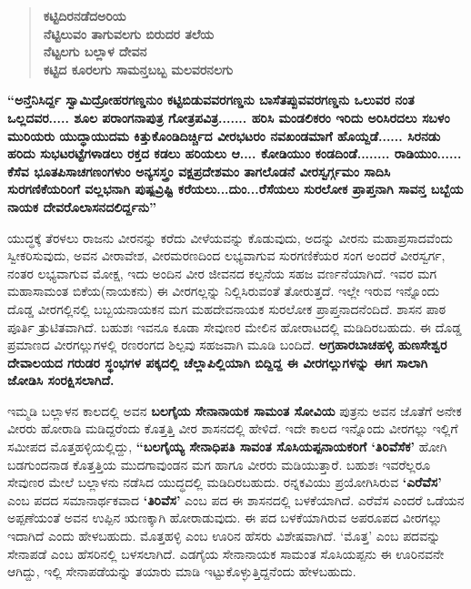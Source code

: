 \begin{verse}
\textbf{ಕಟ್ಟಿದಿರನಡೆದಅರಿಯ}\\\textbf{ನೆಟ್ಟಿಲುವಂ ತಾಗುವಲಗು ಬಿರುದರ ತಲೆಯ}\\\textbf{ನೆಟ್ಟಲಗು ಬಲ್ಲಾಳ ದೇವನ}\\\textbf{ಕಟ್ಟಿದ ಕೂರಲಗು ಸಾಮನ್ತಬಬ್ಬ ಮಲವರನಲಗು}
\end{verse}

\textbf{“ಅನ್ತೆನಿಸಿರ್ದ್ದ ಸ್ವಾಮಿದ್ರೋಹರಗಣ್ಡನುಂ ಕಟ್ಟಿಬಿಡುವವರಗಣ್ಡನು ಬಾಸೆತಪ್ಪುವವರಗಣ್ಡನು ಒಲುವರ ನಂತ\general{\break } ಒಲ್ಲದವರ..... ಶೂಲ ಪರಾಂಗನಾಪುತ್ರ ಗೋತ್ರಪವಿತ್ರ....... ಹರಿಸಿ ಮಂಡಲಿಕರಂ ಇರಿದು ಅರಿಸಿರದಲು ಸಬಳಂ ಮುರಿಯರು ಯುದ್ಧಾಯುದಮ ಕಿತ್ತುಕೊಂಡಿದಿರ್ಚ್ಚಿದ ವೀರಭಟರಂ ನವಖಂಡಮಾಗೆ ಹೊಯ್ದಡೆ...... ಸಿರನಡು ಹರಿದು ಸುಭಟರಟ್ಟೆಗಳಾಡಲು ರಕ್ತದ ಕಡಲು ಹರಿಯಲು ಆ.... ಕೋಡಿಯುಂ ಕಂಡದಿಂಡೆ........ ರಾಡಿಯುಂ...... ಕೆಸೆವ ಭೂತಪಿಸಾಚಗಣಂಗಳುಂ ಅನ್ಯಸಸ್ತ್ರಂ ವಕ್ಷಪ್ರದೇಶಮಂ ತಾಗಲೊಡನೆ ವೀರಸ್ವರ್ಗ್ಗಮಂ ಸಾದಿಸಿ ಸುರಗಣಿಕೆಯರಿಂಗೆ ವಲ್ಲಭನಾಗಿ ಪುಷ್ಪವ್ರಿಷ್ಟಿ ಕರೆಯಲು...ದುಂ...ರೆಸೆಯಲು ಸುರಲೋಕ ಪ್ರಾಪ್ತನಾಗಿ ಸಾವನ್ತ ಬಬ್ಬೆಯ ನಾಯಕ ದೇವರೊಲಾಸನದಲಿರ್ದ್ದನು”}

ಯುದ್ಧಕ್ಕೆ ತೆರಳಲು ರಾಜನು ವೀರನನ್ನು ಕರೆದು ವೀಳೆಯವನ್ನು ಕೊಡುವುದು, ಅದನ್ನು ವೀರನು ಮಹಾಪ್ರಸಾದ\-ವೆಂದು ಸ್ವೀಕರಿಸುವುದು, ಅವನ ವೀರಾವೇಶ, ವೀರಮರಣದಿಂದ ಲಭ್ಯವಾಗುವ ಸುರಗಣಿಕೆಯರ ಸಂಗ ಅಂದರೆ ವೀರಸ್ವರ್ಗ, ನಂತರ ಲಭ್ಯವಾಗುವ ಮೋಕ್ಷ, ಇದು ಅಂದಿನ ವೀರ ಜೀವನದ ಕಲ್ಪನೆಯ ಸಹಜ ವರ್ಣನೆಯಾಗಿದೆ. ಇವರ ಮಗ ಮಹಾಸಾಮಂತ ಬಿಕೆಯ(ನಾಯಕನು) ಈ ವೀರಗಲ್ಲನ್ನು ನಿಲ್ಲಿಸಿರುವಂತೆ ತೋರುತ್ತದೆ. ಇಲ್ಲೇ ಇರುವ ಇನ್ನೊಂದು ದೊಡ್ಡ ವೀರಗಲ್ಲಿನಲ್ಲಿ ಬಬ್ಬಯನಾಯಕನ ಮಗ ಮಹದೇವನಾಯಕ ಸುರಲೋಕ ಪ್ರಾಪ್ತನಾದನೆಂದಿದೆ. ಶಾಸನ ಪಾಠ ಪೂರ್ತಿ ತ್ರುಟಿತವಾಗಿದೆ. ಬಹುಶಃ ಇವನೂ ಕೂಡಾ ಸೇವುಣರ ಮೇಲಿನ ಹೋರಾಟದಲ್ಲಿ ಮಡಿದಿರಬಹುದು. ಈ ದೊಡ್ಡ ಪ್ರಮಾಣದ ವೀರಗಲ್ಲುಗಳಲ್ಲಿ ರಣರಂಗದ ಶಿಲ್ಪವು ಸಹಜವಾಗಿ ಮೂಡಿ ಬಂದಿದೆ. \textbf{ಅಗ್ರಹಾರಬಾಚಹಳ್ಳಿ ಹುಣಸೇಶ್ವರ ದೇವಾಲಯದ ಗರುಡರ ಸ್ಥಂಭಗಳ ಪಕ್ಕದಲ್ಲಿ ಚೆಲ್ಲಾಪಿಲ್ಲಿಯಾಗಿ ಬಿದ್ದಿದ್ದ ಈ ವೀರಗಲ್ಲುಗಳನ್ನು ಈಗ ಸಾಲಾಗಿ ಜೋಡಿಸಿ ಸಂರಕ್ಷಿಸಲಾಗಿದೆ.}

ಇಮ್ಮಡಿ ಬಲ್ಲಾಳನ ಕಾಲದಲ್ಲಿ ಅವನ \textbf{ಬಲಗೈಯ ಸೇನಾನಾಯಕ ಸಾಮಂತ ಸೋವಿಯ} ಪುತ್ರನು ಅವನ ಜೊತೆಗೆ ಅನೇಕ ವೀರರು ಹೋರಾಡಿ ಮಡಿದ್ದರೆಂದು ಕೊತ್ತತ್ತಿ ವೀರ ಶಾಸನದಲ್ಲಿ ಹೇಳಿದೆ. ಇದೇ ಕಾಲದ ಇನ್ನೊಂದು ವೀರಗಲ್ಲು ಇಲ್ಲಿಗೆ ಸಮೀಪದ ಮೊತ್ತಹಳ್ಳಿಯಲ್ಲಿದ್ದು, \textbf{“ಬಲಗೈಯ್ಯ ಸೇನಾಧಿಪತಿ ಸಾವಂತ ಸೊಸಿಯಪ್ಪನಾಯಕರಿಗೆ ‘ತಿರಿವೆಸೆಕ’} ಹೋಗಿ ಬಡಗುಂದನಾಡ ಕೊತ್ತತ್ತಿಯ ಮುದಗಾವುಂಡನ ಮಗ ಹಾಗೂ ವೀರರು ಮಡಿಯುತ್ತಾರೆ. ಬಹುಶಃ ಇವರೆಲ್ಲರೂ ಸೇವುಣರ ಮೇಲೆ ಬಲ್ಲಾಳನು ನಡೆಸಿದ ಯುದ್ಧದಲ್ಲಿ ಮಡಿದಿರಬಹುದು. ರನ್ನಕವಿಯು ಪ್ರಯೋಗಿಸಿರುವ \textbf{‘ಎರೆವೆಸ’} ಎಂಬ ಪದದ ಸಮಾನಾರ್ಥಕವಾದ \textbf{‘ತಿರಿವೆಸ’} ಎಂಬ ಪದ ಈ ಶಾಸನದಲ್ಲಿ ಬಳಕೆಯಾಗಿದೆ. ಎರೆವೆಸ ಎಂದರೆ ಒಡೆಯನ ಅಪ್ಪಣೆಯಂತೆ ಅವನ ಉಪ್ಪಿನ ಋಣಕ್ಕಾಗಿ ಹೋರಾಡುವುದು. ಈ ಪದ ಬಳಕೆಯಾಗಿರುವ ಅಪರೂಪದ ವೀರಗಲ್ಲು ಇದಾಗಿದೆ ಎಂದು ಹೇಳಬಹುದು. ಮೊತ್ತಹಳ್ಳಿ ಎಂಬ ಊರಿನ ಹೆಸರು ವಿಶೇಷವಾಗಿದೆ. ‘ಮೊತ್ತ’ ಎಂಬ ಪದವನ್ನು ಸೇನಾಪಡೆ ಎಂಬ ಹೆಸರಿನಲ್ಲಿ ಬಳಸಲಾಗಿದೆ. ಎಡಗೈಯ ಸೇನಾನಾಯಕ ಸಾಮಂತ ಸೊಸಿಯಪ್ಪನು ಈ ಊರಿನವನೇ ಆಗಿದ್ದು, ಇಲ್ಲಿ ಸೇನಾಪಡೆಯನ್ನು ತಯಾರು ಮಾಡಿ ಇಟ್ಟುಕೊಳ್ಳುತ್ತಿದ್ದನೆಂದು ಹೇಳಬಹುದು.

